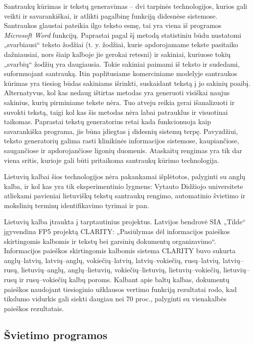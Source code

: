 \documentclass[]{../metanetpaper}
\begin{document}
\begin{multicols}{2}
   Santraukų kūrimas ir tekstų generavimas – dvi tarpinės technologijos, kurios gali veikti ir savarankiškai, ir atlikti pagalbinę funkciją didesnėse sistemose. Santraukos glaustai pateikia ilgo teksto esmę, tai yra viena iš programos \textit{Microsoft Word} funkcijų. Paprastai pagal šį metodą statistiniu būdu nustatomi „svarbiausi“ teksto žodžiai (t. y. žodžiai, kurie apdorojamame tekste pasitaiko dažniausiai, nors šiaip kalboje jie gerokai retesni) ir sakiniai, kuriuose tokių „svarbių“ žodžių yra daugiausia. Tokie sakiniai paimami iš teksto ir sudedami, suformuojant santrauką. Itin paplitusiame komerciniame modelyje santraukos kūrimas yra tiesiog būdas sakiniams išrinkti, suskaidant tekstą į jo sakinių poaibį. Alternatyvus, kol kas nedaug ištirtas metodas yra generuoti visiškai naujus sakinius, kurių pirminiame tekste nėra. Tuo atveju reikia gerai išanalizuoti ir suvokti tekstą, taigi kol kas šis metodas nėra labai patrauklus ir visuotinai taikomas. Paprastai tekstų generatorius retai kada funkcionuoja kaip savarankiška programa, jis būna įdiegtas į didesnių sistemų terpę. Pavyzdžiui, teksto generatorių galima rasti klinikinės informacijos sistemose, kaupiančiose, saugančiose ir apdorojančiose ligonių duomenis. Ataskaitų rengimas yra tik dar viena sritis, kurioje gali būti pritaikoma santraukų kūrimo technologija.   

    Lietuvių kalbai šios technologijos nėra pakankamai išplėtotos, palyginti su anglų kalba, ir kol kas yra tik eksperimentinio lygmens: Vytauto Didžiojo universitete atliekami pavieniai lietuviškų tekstų santraukų rengimo, automatinio švietimo ir mokslinių terminų identifikavimo tyrimai ir pan.    

   Lietuvių kalba įtraukta į tarptautinius projektus. Latvijos bendrovė SIA „Tilde“ įgyvendina  FP5 projektą CLARITY: „Pasiūlymas dėl informacijos paieškos skirtingomis kalbomis ir tekstų bei garsinių dokumentų organizavimo“. Informacijos paieškos skirtingomis kalbomis sistema CLARITY buvo sukurta anglų–latvių, latvių–anglų, vokiečių–latvių, latvių–vokiečių, rusų–latvių, latvių–rusų, lietuvių–anglų, anglų–lietuvių, vokiečių–lietuvių, lietuvių–vokiečių, lietuvių–rusų ir rusų–vokiečių kalbų poroms. Kalbant apie baltų kalbas, dokumentų paieškos naudojant tiesioginio užklausos vertimo funkciją rezultatai rodo, kad tikslumo vidurkis gali siekti daugiau nei 70 proc., palyginti su vienakalbės paieškos rezultatais.

\subsection{Švietimo programos}


\end{multicols}
\end{document}
